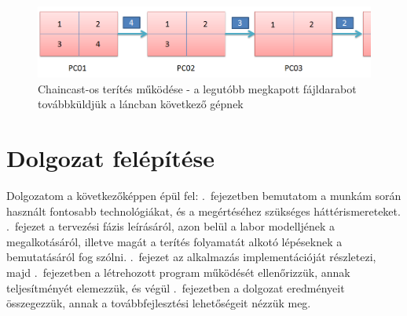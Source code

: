 \begin{figure}[ht]
\centering
\includegraphics[width=140mm, keepaspectratio]{figures/chaincast.png}
\caption{Chaincast-os terítés működése - a legutóbb megkapott fájldarabot továbbküldjük a láncban következő gépnek}
\label{fig:chaincast}
\end{figure}

\section{Dolgozat felépítése}

Dolgozatom a következőképpen épül fel:
.~fejezetben bemutatom a munkám során használt fontosabb technológiákat, és a megértéséhez szükséges háttérismereteket. .~fejezet a tervezési fázis leírásáról, azon belül a labor modelljének a megalkotásáról, illetve magát a terítés folyamatát alkotó lépéseknek a bemutatásáról fog szólni. .~fejezet az alkalmazás implementációját részletezi, majd .~fejezetben a létrehozott program működését ellenőrizzük, annak teljesítményét elemezzük, és végül .~fejezetben a dolgozat eredményeit összegezzük, annak a továbbfejlesztési lehetőségeit nézzük meg.
